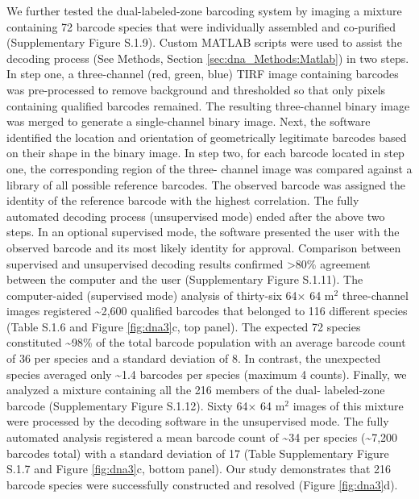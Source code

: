 

We further tested the dual-labeled-zone barcoding system by imaging a mixture 
containing 72 barcode species that were individually assembled and co-purified (Supplementary Figure 
S.1.9). Custom MATLAB scripts were used to assist the decoding process (See Methods, Section \ref{sec:dna_Methods:Matlab}) in 
two steps. In step one, a three-channel (red, green, blue) TIRF image containing barcodes 
was pre-processed to remove background and thresholded so that only pixels containing 
qualified barcodes remained. The resulting three-channel binary image was merged to 
generate a single-channel binary image. Next, the software identified the location and 
orientation of geometrically legitimate barcodes based on their shape in the binary image. 
In step two, for each barcode located in step one, the corresponding region of the three- 
channel image was compared against a library of all possible reference barcodes. The 
observed barcode was assigned the identity of the reference barcode with the highest 
correlation. The fully automated decoding process (unsupervised mode) ended after the 
above two steps. In an optional supervised mode, the software presented the user with the 
observed barcode and its most likely identity for approval. Comparison between 
supervised and unsupervised decoding results confirmed >80\% agreement between the 
computer and the user (Supplementary Figure 
S.1.11). The computer-aided 
(supervised mode) analysis of thirty-six 64× 64 
 \textmu m$^2$ three-channel images registered 
\textasciitilde2,600 qualified barcodes that belonged to 116 different species (Table S.1.6 and Figure \ref{fig:dna3}c, 
top panel). The expected 72 species constituted \textasciitilde98\% of the total barcode population 
with an average barcode count of 36 per species and a standard deviation of 8. In 
contrast, the unexpected species averaged only \textasciitilde1.4 barcodes per species (maximum 4 
counts). Finally, we analyzed a mixture containing all the 216 members of the dual- 
labeled-zone barcode (Supplementary Figure S.1.12). Sixty 64× 
64 
 \textmu m$^2$
images of this mixture were 
processed by the decoding software in the unsupervised mode. The fully automated 
analysis registered a mean barcode count of \textasciitilde34 per species (\textasciitilde7,200 barcodes total) with 
a standard deviation of 17 (Table Supplementary Figure S.1.7 and Figure \ref{fig:dna3}c, bottom panel). Our study demonstrates that 216 
barcode species were successfully constructed and resolved (Figure \ref{fig:dna3}d). 



